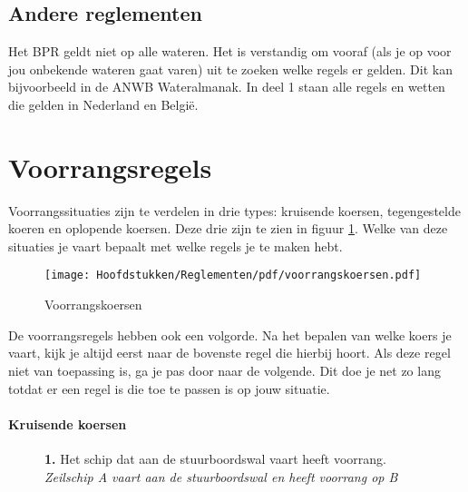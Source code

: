 \subsection{Andere reglementen}
Het BPR geldt niet op alle wateren. Het is verstandig om vooraf (als je op voor jou onbekende wateren gaat varen) uit te zoeken welke regels er gelden. Dit kan bijvoorbeeld in de ANWB Wateralmanak. In deel 1 staan alle regels en wetten die gelden in Nederland en België. 

\newpage
\section{Voorrangsregels}
Voorrangssituaties zijn te verdelen in drie types: kruisende koersen, tegengestelde koeren en oplopende koersen. Deze drie zijn te zien in figuur \ref{pic:voorrangkoers}. Welke van deze situaties je vaart bepaalt met welke regels je te maken hebt. 
\begin{figure}[H]
    \centering
    \texttt{[image: Hoofdstukken/Reglementen/pdf/voorrangskoersen.pdf]}
    \caption{Voorrangskoersen}
    \centering
    \label{pic:voorrangkoers}
\end{figure}
De voorrangsregels hebben ook een volgorde. Na het bepalen van welke koers je vaart, kijk je altijd eerst naar de bovenste regel die hierbij hoort. Als deze regel niet van toepassing is, ga je pas door naar de volgende. Dit doe je net zo lang totdat er een regel is die toe te passen is op jouw situatie.


\paragraph{Kruisende koersen}
\vspace{-0.7cm}
\begin{figure}[H]
	\centering
	\begin{minipage}[t]{0.70\textwidth}
		\textbf{1.} Het schip dat aan de stuurboordswal vaart heeft voorrang.\\
		\textit{Zeilschip A vaart aan de stuurboordswal en heeft voorrang op B}
	\end{minipage}
	\hfill
	\begin{minipage}[t]{0.20\textwidth}
		\label{pic:kr1}
	\end{minipage}
	\hfill
\end{figure}

